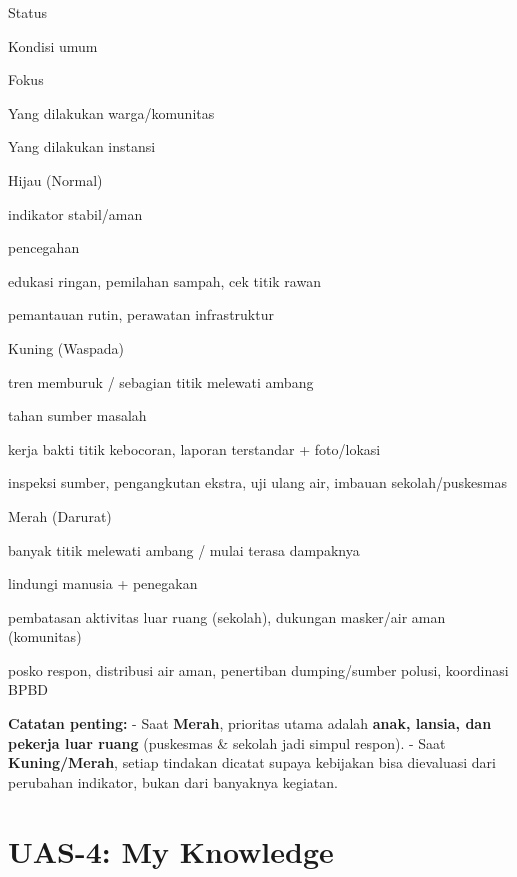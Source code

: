\documentclass[
  letterpaper,
  DIV=11,
  numbers=noendperiod]{scrreprt}
\begin{document}
Status

Kondisi umum

Fokus

Yang dilakukan warga/komunitas

Yang dilakukan instansi

{}Hijau (Normal)

indikator stabil/aman

pencegahan

edukasi ringan, pemilahan sampah, cek titik rawan

pemantauan rutin, perawatan infrastruktur

{}Kuning (Waspada)

tren memburuk / sebagian titik melewati ambang

tahan sumber masalah

kerja bakti titik kebocoran, laporan terstandar + foto/lokasi

inspeksi sumber, pengangkutan ekstra, uji ulang air, imbauan
sekolah/puskesmas

{}Merah (Darurat)

banyak titik melewati ambang / mulai terasa dampaknya

lindungi manusia + penegakan

pembatasan aktivitas luar ruang (sekolah), dukungan masker/air aman
(komunitas)

posko respon, distribusi air aman, penertiban dumping/sumber polusi,
koordinasi BPBD

\begin{tcolorbox}[enhanced jigsaw, colback=white, colframe=quarto-callout-tip-color-frame, left=2mm, arc=.35mm, bottomrule=.15mm, opacityback=0, opacitybacktitle=0.6, coltitle=black, toprule=.15mm, colbacktitle=quarto-callout-tip-color!10!white, breakable, titlerule=0mm, leftrule=.75mm, title=\textcolor{quarto-callout-tip-color}{\faLightbulb}\hspace{0.5em}{Tip}, toptitle=1mm, bottomtitle=1mm, rightrule=.15mm]

\textbf{Catatan penting:} - Saat \textbf{Merah}, prioritas utama adalah
\textbf{anak, lansia, dan pekerja luar ruang} (puskesmas \& sekolah jadi
simpul respon). - Saat \textbf{Kuning/Merah}, setiap tindakan dicatat
supaya kebijakan bisa dievaluasi dari perubahan indikator, bukan dari
banyaknya kegiatan.

\end{tcolorbox}


\chapter{UAS-4: My Knowledge}\label{uas-4-my-knowledge}
\end{document}
